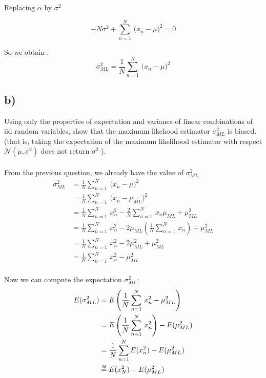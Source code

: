 \documentclass[12pt,twoside]{article}
\newcommand\myeq{\mathrel{\overset{\makebox[0pt]{\mbox{\normalfont\tiny\sffamily iid}}}{=}}}
\begin{document}
Replacing $\alpha$ by $\sigma^2$

\begin{equation*}
-N \sigma^2 + \sum_{n=1}^{N}  \,  \big(x_n - \mu\big)^2  = 0
\end{equation*}

So we obtain :
\begin{equation}
\boxed{ \sigma^2 _{ML} = \frac{1}{N} \sum_{n=1}^{N}  \,  \big(x_n - \mu\big)^2}
\end{equation}
\subsection*{b)} Using only the properties of expectation and variance of linear combinations of iid random variables, show that the maximum likehood estimator $\sigma^2 _{ML}$ is biased. (that is, taking the expectation of the maximum likelihood estimator with respect $\mathcal{N}(\mu, \sigma^2)$ does not return $\sigma^2$ ).\\ \\

From the previous question, we already have the value of $\sigma^2 _{ML}$
\begin{align*}
\sigma^2 _{ML} &= \frac{1}{N} \sum_{n=1}^{N}  \,  \big(x_n - \mu\big)^2 \\
               &= \frac{1}{N} \sum_{n=1}^{N}  \,  \big(x_n - \mu_{ML}\big)^2 \\
               &= \frac{1}{N} \sum_{n=1}^{N}  \,  x_n^2 - \frac{2}{N} \sum_{n=1}^{N}  \, x_n \mu_{ML}  + \mu_{ML}^2 \\
               &= \frac{1}{N} \sum_{n=1}^{N}  \,  x_n^2 -  2 \mu_{ML} \left( \frac{1}{N} \sum_{n=1}^{N}  \, x_n \right)   + \mu_{ML}^2 \\
               &= \frac{1}{N} \sum_{n=1}^{N}  \,  x_n^2 -  2 \mu_{ML}^2 + \mu_{ML}^2 \\
               &= \frac{1}{N} \sum_{n=1}^{N}  \,  x_n^2  - \mu_{ML}^2 \\
\end{align*}

Now we can compute the expectation $\sigma^2 _{ML}$:
\begin{align*}
E(\sigma^2 _{ML}) &= E\left(\frac{1}{N} \sum_{n=1}^{N}  \,  x_n^2  - \mu_{ML}^2 \right) \\
&= E \left(\frac{1}{N} \sum_{n=1}^{N}  \,  x_n^2 \right)  - E(\mu_{ML}^2) \\
&= \frac{1}{N} \sum_{n=1}^{N} E(x_n^2)  - E(\mu_{ML}^2) \\
& \myeq  E(x_N^2) - E(\mu_{ML}^2) \\
\end{align*}
\end{document}
